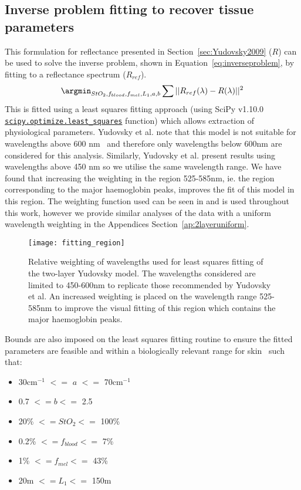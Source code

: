 \subsection{Inverse problem fitting to recover tissue parameters}\label{sec:methodinverse}
This formulation for reflectance presented in Section~\ref{sec:Yudovsky2009} ($R$) can be used to solve the inverse problem, shown in Equation~\eqref{eq:inverseproblem}, by fitting to a reflectance spectrum ($R_{ref}$). 
\begin{equation}
    \argmin_{StO_2, f_{blood}, f_{mel}, L_1, a, b} \sum || R_{ref}(\lambda) - R(\lambda) ||^2
    \label{eq:inverseproblem}
\end{equation}
This is fitted using a least squares fitting approach (using SciPy v1.10.0  \newline \href{https://docs.scipy.org/doc/scipy/reference/generated/scipy.optimize.least_squares.html}{\texttt{scipy.optimize.least\_squares}} function) which allows extraction of physiological parameters. 
Yudovsky et al. note that this model is not suitable for wavelengths above 600 nm~\citep{Yudovsky2011a} and therefore only wavelengths below 600nm are considered for this analysis. Similarly, Yudovsky et al. present results using wavelengths above 450 nm so we utilise the same wavelength range. We have found that increasing the weighting in the region 525-585nm, ie. the region corresponding to the major haemoglobin peaks, improves the fit of this model in this region. The weighting function used can be seen in  and is used throughout this work, however we provide similar analyses of the data with a uniform wavelength weighting in the Appendices Section~\ref{ap:2layeruniform}. 
\begin{figure}
    \centering
    \texttt{[image: fitting\_region]}
    \caption{Relative weighting of wavelengths used for least squares fitting of the two-layer Yudovsky model. The wavelengths considered are limited to 450-600nm to replicate those recommended by Yudovsky et al. An increased weighting is placed on the wavelength range 525-585nm to improve the visual fitting of this region which contains the major haemoglobin peaks.}
    \label{fig:weighting}
\end{figure}
Bounds are also imposed on the least squares fitting routine to ensure the fitted parameters are feasible and within a biologically relevant range for skin~\citep{Yudovsky2009, Jacques2013} such that:
\begin{itemize}
    \item 30cm$^{-1}$ $<=$ $a$ $<=$ 70cm$^{-1}$
    \item 0.7 $<= b <=$ 2.5
    \item 20\% $<= StO_2 <=$ 100\%
    \item 0.2\% $<= f_{blood} <=$ 7\% 
    \item 1\% $<= f_{mel} <=$ 43\% 
    \item 20{\textmu}m $<= L_1 <=$ 150{\textmu}m
\end{itemize}
